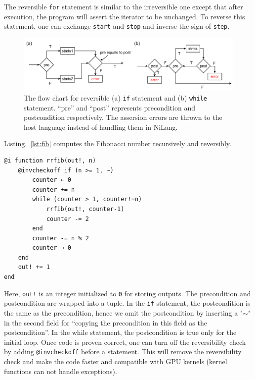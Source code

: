 \documentclass{article}
\let\oldsim\sim
\renewcommand{\sim}{{\oldsim}}
\newcommand{\<}{\langle}
\renewcommand{\>}{\rangle}
\newcommand{\Lst}[1]{Listing.~\ref{#1}}
\theoremstyle{definition}\newtheorem{definition}{\textit{Definition}}
\begin{document}
The reversible \texttt{for} statement is similar to the irreversible one except that after execution, the program will assert the iterator to be unchanged. To reverse this statement, one can exchange \texttt{start} and \texttt{stop} and inverse the sign of \texttt{step}.
\begin{figure}
    \centerline{\includegraphics[width=0.9\columnwidth,trim={0 0cm 0 0cm},clip]{controlflow.pdf}}
    \caption{The flow chart for reversible (a) \texttt{if} statement and (b) \texttt{while} statement. ``pre'' and ``post'' represents precondition and postcondition respectively. The assersion errors are thrown to the host language instead of handling them in NiLang.}\label{fig:controlflow}
\end{figure}
\Lst{lst:fib} computes the Fibonacci number recursively and reversibly.

\begin{minipage}{.88\columnwidth}
\begin{lstlisting}[mathescape=true,caption={Computing Fibonacci number recursively and reversibly.},label={lst:fib}]
@i function rrfib(out!, n)
    @invcheckoff if (n >= 1, ~)
        counter ← 0
        counter += n
        while (counter > 1, counter!=n)
            rrfib(out!, counter-1)
            counter -= 2
        end
        counter -= n % 2
        counter → 0
    end
    out! += 1
end
\end{lstlisting}
\end{minipage}

Here, \texttt{out!} is an integer initialized to \texttt{0} for storing outputs.
The precondition and postcondition are wrapped into a tuple. In the \texttt{if} statement, the postcondition is the same as the precondition, hence we omit the postcondition by inserting a "\texttt{$\sim$}" in the second field for ``copying the precondition in this field as the postcondition''.
In the while statement, the postcondition is true only for the initial loop.
Once code is proven correct, one can turn off the reversibility check by adding \texttt{@invcheckoff} before a statement.
This will remove the reversibility check and make the code faster and compatible with GPU kernels (kernel functions can not handle exceptions).
\end{document}
